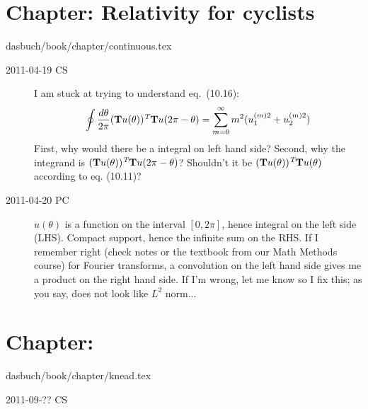 \section{Chapter: Relativity for cyclists}
\noindent dasbuch/book/chapter/continuous.tex
\begin{description}
\item[2011-04-19 CS]
I am stuck at trying to understand eq.~(10.16):
\[
\oint\frac{d\theta}{2\pi}(\textbf{T}u(\theta))^{\emph{T}}\textbf{T}u(2\pi-\theta)
 = \sum\limits_{m=0}^{\infty}m^{2}(u_{1}^{(m)2}+u_{2}^{(m)2})
\]
First, why would there be a integral on left hand side? Second, why the
integrand is $(\textbf{T}u(\theta))^{\emph{T}}\textbf{T}u(2\pi-\theta)$?
Shouldn't it be $(\textbf{T}u(\theta))^{\emph{T}}\textbf{T}u(\theta)$
according to eq. (10.11)?

\item[2011-04-20 PC] $u(\theta)$ is a function on the interval $[0,2\pi]$,
hence integral on the left side (LHS). Compact support, hence the infinite sum
on the RHS. If I remember right (check notes or the textbook from
our Math Methods course) for Fourier transforms, a convolution on the
left hand side gives me a product on the right hand side. If I'm wrong,
let me know so I fix this; as you say, does not look like $L^2$ norm...


\end{description}


\section{Chapter: }\noindent dasbuch/book/chapter/knead.tex
\begin{description}\item[2011-09-?? CS]

\end{description}


